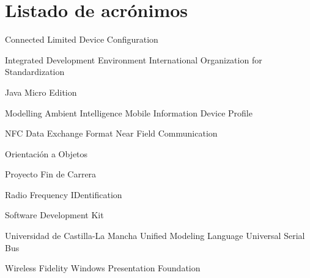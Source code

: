 
\chapter{Listado de acrónimos}

{\small
\begin{acronym}[XXXXXXXX]
      {Connected Limited Device Configuration}

       {Integrated Development Environment}
       {International Organization for Standardization}

    {Java Micro Edition}

      {Modelling Ambient Intelligence}
      {Mobile Information Device Profile}

      {NFC Data Exchange Format}
       {Near Field Communication}

        {Orientación a Objetos}

        {Proyecto Fin de Carrera}

      {Radio Frequency IDentification}

       {Software Development Kit}

      {Universidad de Castilla-La Mancha}
       {Unified Modeling Language}
       {Universal Serial Bus}

      {Wireless Fidelity}
       {Windows Presentation Foundation}
\end{acronym}
}




